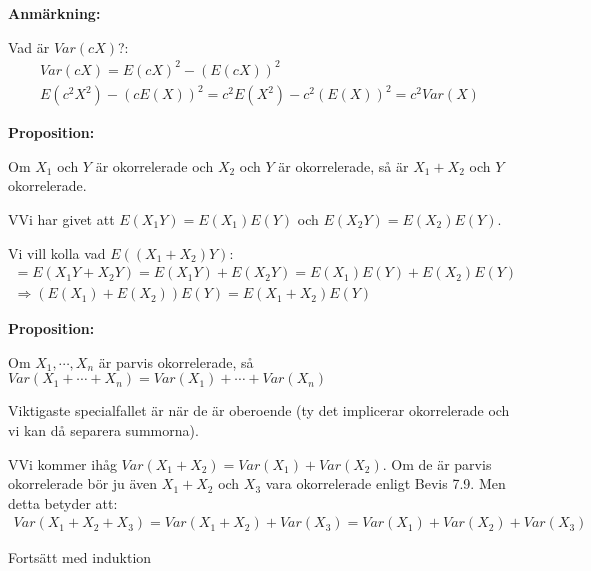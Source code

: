 \noindent\textbf{Anmärkning:}\par
\noindent Vad är $Var(cX)$?:
\begin{equation*}
  \begin{gathered}
    Var(cX) = E(cX)^2-\left(E(cX)\right)^2\\
    E(c^2X^2)-(cE(X))^2 = c^2E(X^2)-c^2(E(X))^2= c^2Var(X)
  \end{gathered}
\end{equation*}
\par\bigskip
\noindent\textbf{Proposition:}\par
\noindent Om $X_1$ och $Y$ är okorrelerade och $X_2$ och $Y$ är okorrelerade, så är $X_1+X_2$ och $Y$ okorrelerade.
\par\bigskip
\begin{prf}
  VVi har givet att $E(X_1Y) = E(X_1)E(Y)$ och $E(X_2Y)=E(X_2)E(Y)$.\par
  \noindent Vi vill kolla vad $E((X_1+X_2)Y)$:
  \begin{equation*}
    \begin{gathered}
      = E(X_1Y+X_2Y) = E(X_1Y)+E(X_2Y) = E(X_1)E(Y)+E(X_2)E(Y)\\
      \Rightarrow (E(X_1)+E(X_2))E(Y) = E(X_1+X_2)E(Y)
    \end{gathered}
  \end{equation*}
\end{prf}
\par\bigskip
\noindent\textbf{Proposition:}\par
\noindent Om $X_1,\cdots, X_n$ är parvis okorrelerade, så $Var(X_1+\cdots+X_n) = Var(X_1)+\cdots+Var(X_n)$\par
\noindent Viktigaste specialfallet är när de är oberoende (ty det implicerar okorrelerade och vi kan då separera summorna).
\par\bigskip
\begin{prf}
  VVi kommer ihåg $Var(X_1+X_2) = Var(X_1)+Var(X_2)$. Om de är parvis okorrelerade bör ju även $X_1+X_2$ och $X_3$ vara okorrelerade enligt Bevis 7.9. Men detta betyder att:
  \begin{equation*}
    \begin{gathered}
      Var(X_1+X_2+X_3) = Var(X_1+X_2)+Var(X_3)= Var(X_1)+Var(X_2)+Var(X_3)
    \end{gathered}
  \end{equation*}\par
  \noindent Fortsätt med induktion
\end{prf}
\par\bigskip
